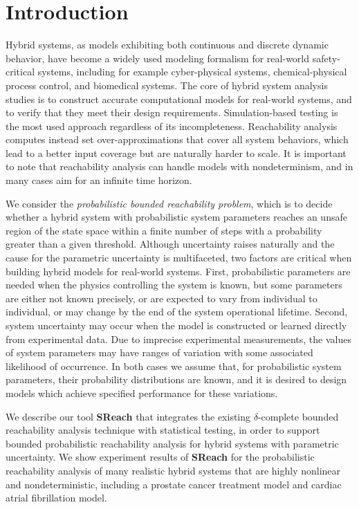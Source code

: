 \section{Introduction}  
Hybrid systems, as models exhibiting both continuous and discrete dynamic behavior, have become 
a widely used modeling formalism for real-world safety-critical systems,
including for example cyber-physical systems, chemical-physical process control, and biomedical systems. 
The core of hybrid system analysis studies is to construct accurate computational models for real-world systems, 
and to verify that they meet their design requirements. Simulation-based testing 
is the most used approach regardless of its incompleteness. Reachability analysis computes instead set over-approximations that
cover all system behaviors, which lead to a better input coverage but are naturally harder to scale.
It is important to note that reachability analysis can handle models with nondeterminism, and in many cases aim for an infinite time horizon.

We consider the {\em probabilistic bounded reachability problem}, which is to decide whether
a hybrid system with probabilistic system parameters reaches an unsafe region of the
state space within a finite number of steps with a probability greater than a given threshold.
Although uncertainty raises naturally and the cause for the parametric uncertainty is multifaceted, two factors 
are critical when building hybrid models for real-world systems. 
First, probabilistic parameters are needed when the physics controlling the system is known, but some 
parameters are either not known precisely, or are expected to vary from individual to individual, 
or may change by the end of the system operational lifetime. 
Second, system uncertainty may occur when the model is constructed or learned directly from experimental data. 
Due to imprecise experimental measurements, the values of system parameters may have ranges of variation 
with some associated likelihood of occurrence. 
In both cases we assume that, for probabilistic system parameters, their probability distributions
are known, and it is desired to design models which achieve specified performance for these variations.   

We describe our tool {\bf SReach} that integrates the existing $\delta$-complete bounded 
reachability analysis technique \cite{gaodelta} with statistical testing, in order
to support bounded probabilistic reachability analysis for hybrid systems with parametric uncertainty. 
We show experiment results of {\bf SReach} for the probabilistic reachability analysis of many realistic hybrid systems that are highly nonlinear and nondeterministic, including a prostate cancer treatment model and cardiac atrial fibrillation model. 

